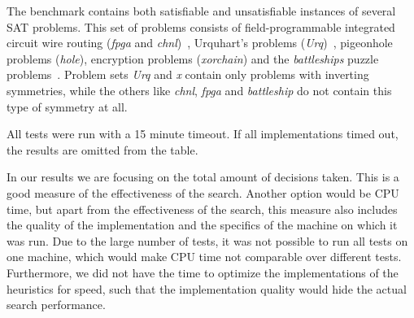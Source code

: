 	The benchmark contains both satisfiable and unsatisfiable instances of several SAT problems.
	This set of problems consists of field-programmable integrated circuit wire routing (\emph{fpga} and
	\emph{chnl})~\cite{nam2004comparative}, Urquhart's problems (\emph{Urq})~\cite{urquhart1987hard},
	pigeonhole problems (\emph{hole}), encryption problems (\emph{xorchain}) and the \emph{battleships}
	puzzle problems~\cite{sevenster2004battleships}.
	Problem sets \emph{Urq} and \emph{x} contain only problems with inverting symmetries, while the
	others like \emph{chnl}, \emph{fpga} and \emph{battleship} do not contain this type of symmetry
	at all\cite{devriendt2012symmetry}.

	All tests were run with a 15 minute timeout.
	If all implementations timed out, the results are omitted from the table.

	In our results we are focusing on the total amount of decisions taken.
	This is a good measure of the effectiveness of the search.
	Another option would be CPU time, but apart from the effectiveness of the search, this measure
	also includes the quality of the implementation and the specifics of the machine on which it was
	run.
	Due to the large number of tests, it was not possible to run all tests on one machine, which
	would make CPU time not comparable over different tests.
	Furthermore, we did not have the time to optimize the implementations of the heuristics for
	speed, such that the implementation quality would hide the actual search performance.
